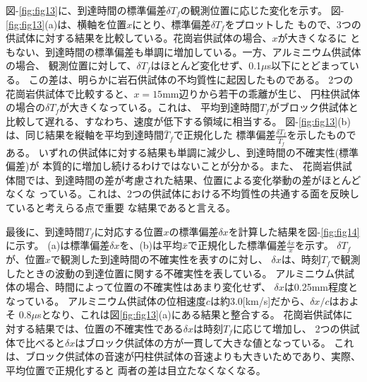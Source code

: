 図-\ref{fig:fig13}に、到達時間の標準偏差$\delta T_f$の観測位置に応じた変化を示す。
図-\ref{fig:fig13}(a)は、横軸を位置$x$にとり、標準偏差$\delta T_f$をプロットした
もので、3つの供試体に対する結果を比較している。花崗岩供試体の場合、$x$が大きくなるに
ともない、到達時間の標準偏差も単調に増加している。一方、アルミニウム供試体の場合、
観測位置に対して、$\delta T_f$はほとんど変化せず、0.1$\mu$s以下にとどまっている。
この差は、明らかに岩石供試体の不均質性に起因したものである。
2つの花崗岩供試体で比較すると、$x=15$mm辺りから若干の乖離が生じ、
円柱供試体の場合の$\delta T_f$が大きくなっている。これは、
平均到達時間$T_f$がブロック供試体と比較して遅れる、すなわち、速度が低下する領域に相当する。
図-\ref{fig:fig13}(b)は、同じ結果を縦軸を平均到達時間$\bar T_f$で正規化した
標準偏差$\frac{\delta T_f}{\bar{T}_f}$を示したものである。
いずれの供試体に対する結果も単調に減少し、到達時間の不確実性(標準偏差)が
本質的に増加し続けるわけではないことが分かる。また、
花崗岩供試体間では、到達時間の差が考慮された結果、位置による変化挙動の差がほとんどなくな
っている。これは、2つの供試体における不均質性の共通する面を反映していると考えらる点で重要
な結果であると言える。

最後に、到達時間$T_f$に対応する位置$x$の標準偏差$\delta x$を計算した結果を図-\ref{fig:fig14}に示す。
(a)は標準偏差$\delta x$を、(b)は平均$\bar{x}$で正規化した標準偏差$\frac{\delta x}{\bar{x}}$を示す。
$\delta T_f$が、位置$x$で観測した到達時間の不確実性を表すのに対し、
$\delta x$は、時刻$T_f$で観測したときの波動の到達位置に関する不確実性を表している。
アルミニウム供試体の場合、時間によって位置の不確実性はあまり変化せず、
$\delta x$は0.25mm程度となっている。
アルミニウム供試体の位相速度$c$は約3.0[km/s]だから、$\delta x/c$はおよそ
$0.8\mu$sとなり、これは図\ref{fig:fig13}(a)にある結果と整合する。
花崗岩供試体に対する結果では、位置の不確実性である$\delta x$は時刻$T_f$に応じて増加し、
2つの供試体で比べると$\delta x$はブロック供試体の方が一貫して大きな値となっている。
これは、ブロック供試体の音速が円柱供試体の音速よりも大きいためであり、実際、平均位置で正規化すると
両者の差は目立たなくなくなる。

